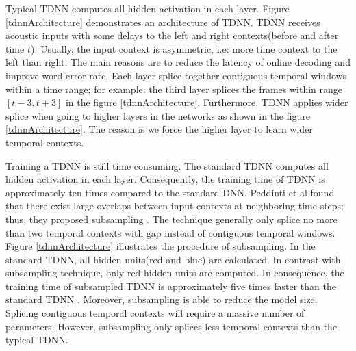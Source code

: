 Typical TDNN computes all hidden activation in each layer. Figure \ref{tdnnArchitecture} demonstrates an architecture of TDNN. TDNN receives acoustic inputs with some delays to the left and right contexts(before and after time $t$). Usually, the input context is asymmetric, i.e: more time context to the left than right. The main reasons are to reduce the latency of online decoding and improve word error rate. Each layer splice together contiguous temporal windows within a time range; for example: the third layer splices the frames within range $[t-3, t+3]$ in the figure  \ref{tdnnArchitecture}. Furthermore, TDNN applies wider splice when going to higher layers in the networks as shown in the figure \ref{tdnnArchitecture}. The reason is we force the higher layer to learn wider temporal contexts.

Training a TDNN is still time consuming. The standard TDNN computes all hidden activation in each layer. Consequently, the training time of TDNN is approximately ten times compared to the standard DNN.  Peddinti et al found that there exist large overlaps between input contexts at neighboring time steps; thus, they proposed subsampling \cite{Peddinti2015ATD}. The technique generally only splice no more than two temporal contexts with gap instead of contiguous temporal windows. Figure \ref{tdnnArchitecture} illustrates the procedure of subsampling. In the standard TDNN, all hidden units(red and blue) are calculated. In contrast with subsampling technique, only red hidden units are computed. In consequence, the training time of subsampled TDNN is approximately five times faster than the standard TDNN \cite{Peddinti2015ATD}. Moreover, subsampling is able to reduce the model size. Splicing contiguous temporal contexts will require a massive number of parameters. However, subsampling only splices less temporal contexts than the typical TDNN.






